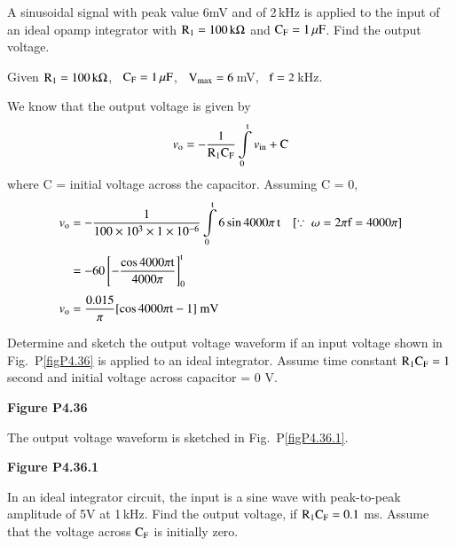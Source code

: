 \begin{problem}\label{prob4.36}
A sinusoidal signal with peak value 6mV and of 2\,kHz is applied to the input of an ideal opamp integrator with $\textrm{R}_{1}=100\,\textrm{k}\Omega$ and $\textrm{C}_{\textrm{F}}=1\,\mu\textrm{F}$. Find the output voltage.
\end{problem}

\begin{solution}
Given $\textrm{R}_{1}=100\,\textrm{k}\Omega$, \ $\textrm{C}_{\textrm{F}}=1\,\mu\textrm{F}$, \ $\textrm{V}_{\max}=6$\,mV, \ $\textrm{f}=2$\,kHz.

We know that the output voltage is given by
$$
v_{\textrm{o}}=-\frac{1}{\textrm{R}_{1}\textrm{C}_{\textrm{F}}}\int\limits^{\textrm{t}}_{0}v_{\text{in}}+\textrm{C}
$$
where C = initial voltage across the capacitor. Assuming C = 0,
\begin{align*}
v_{\rmo} &= -\frac{1}{100\times 10^{3}\times 1\times 10^{-6}}\int\limits^{\rmt}_{0}6\sin 4000 \pi\,\rmt\quad [\because \ \omega=2\pi\rmf=4000\pi]\\[3pt]
&=-60\left[-\frac{\cos 4000\pi \rmt}{4000\pi}\right]^{\rmt}_{0}\\[3pt]
v_{\rmo} &= \frac{0.015}{\pi}[\cos 4000 \pi\rmt-1]\text{~mV}
\end{align*}
\end{solution}

\begin{problem}\label{prob4.37}
Determine and sketch the output voltage waveform if an input voltage shown in Fig.~P\ref{figP4.36} is applied to an ideal integrator. Assume time constant $\textrm{R}_{1}\textrm{C}_{\textrm{F}}=1$ second and initial voltage across capacitor = 0 V.
\begin{center}
{\bf Figure P4.36}
\end{center}
\end{problem}

\begin{solution}
The output voltage waveform is sketched in Fig.~P\ref{figP4.36.1}.
\begin{center}
{\bf Figure P4.36.1}
\end{center}
\end{solution}

\begin{problem}\label{prob4.38}
In an ideal integrator circuit, the input is a sine wave with peak-to-peak amplitude of 5V at 1\,kHz. Find the output voltage, if $\textrm{R}_{1}\textrm{C}_{\textrm{F}}=0.1$ ms. Assume that the voltage across $\textrm{C}_{\textrm{F}}$ is initially zero.
\end{problem}

